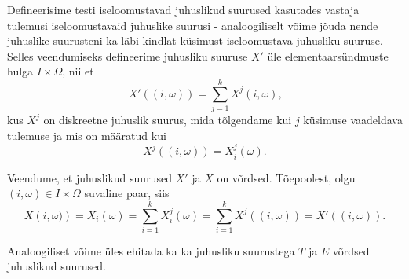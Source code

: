 \documentclass[a4paper,12pt]{article}
\numberwithin{equation}{section}
\theoremstyle{definition}
\begin{document}
Defineerisime testi iseloomustavad juhuslikud suurused kasutades vastaja tulemusi iseloomustavaid juhuslike suurusi - analoogiliselt võime jõuda nende juhuslike suurusteni ka läbi kindlat küsimust iseloomustava juhusliku suuruse. Selles veendumiseks defineerime juhusliku suuruse  $X'$ üle elementaarsündmuste hulga $I \times \Omega$, nii et
\begin{equation*}
	X'\left( ( i, \omega ) \right) = \sum \limits_{j=1}^{k} X^{j} \left(i, \omega \right) \text{,}	
\end{equation*}
kus $X^{j}$ on diskreetne juhuslik suurus, mida tõlgendame kui $j$ küsimuse vaadeldava tulemuse ja mis on määratud kui
\begin{equation*}
X^{j} \left( (i, \omega ) \right) = X_{i}^{j} \left( \omega \right) \text{.}
\end{equation*}

Veendume, et juhuslikud suurused $X'$ ja $X$ on võrdsed. Tõepoolest, olgu $(i,\omega) \in I \times \Omega$ suvaline paar, siis
\begin{equation*}
	X \left (i, \omega) \right) = X_i (\omega) = \sum \limits_{i=1}^{k}X_{i}^{j}(\omega) = \sum \limits_{i=1}^{k}X^{j}\left((i, \omega )\right) = X' \left( (i, \omega ) \right) \text{.}	 
\end{equation*}

Analoogiliset võime üles ehitada ka ka juhusliku suurustega $T$ ja $E$ võrdsed juhuslikud suurused.
\end{document}
